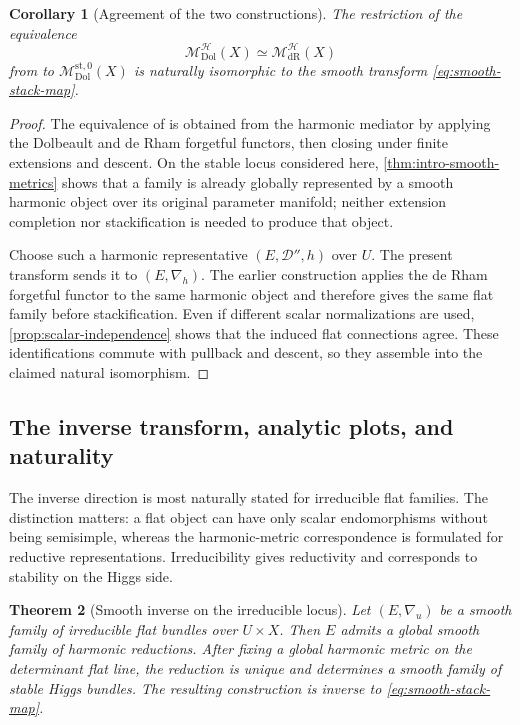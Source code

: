 \documentclass[11pt,reqno]{amsart}
\newtheorem{theorem}{Theorem}[section]
\newtheorem{corollary}[theorem]{Corollary}
\theoremstyle{definition}
\theoremstyle{remark}
\newcommand{\cD}{\mathcal D}
\newcommand{\cH}{\mathcal H}
\newcommand{\Dol}{\mathrm{Dol}}
\newcommand{\dR}{\mathrm{dR}}
\newcommand{\st}{\mathrm{st}}
\newcommand{\MdiffDol}{\mathscr M_{\Dol}}
\newcommand{\MHDol}{\mathscr M^{\cH}_{\Dol}}
\newcommand{\MHdR}{\mathscr M^{\cH}_{\dR}}
\begin{document}
\begin{corollary}[Agreement of the two constructions]\label{cor:agreement}
The restriction of the equivalence
\[
  \MHDol(X)\simeq\MHdR(X)
\]
from \cite{AzamRayan2026} to $\MdiffDol^{\st,0}(X)$ is naturally isomorphic to the smooth transform \eqref{eq:smooth-stack-map}.
\end{corollary}

\begin{proof}
The equivalence of \cite{AzamRayan2026} is obtained from the harmonic mediator by applying the Dolbeault and de Rham forgetful functors, then closing under finite extensions and descent.  On the stable locus considered here, \cref{thm:intro-smooth-metrics} shows that a family is already globally represented by a smooth harmonic object over its original parameter manifold; neither extension completion nor stackification is needed to produce that object.

Choose such a harmonic representative $(E,\cD'',h)$ over $U$.  The present transform sends it to $(E,\nabla_h)$.  The earlier construction applies the de Rham forgetful functor to the same harmonic object and therefore gives the same flat family before stackification.  Even if different scalar normalizations are used, \cref{prop:scalar-independence} shows that the induced flat connections agree.  These identifications commute with pullback and descent, so they assemble into the claimed natural isomorphism.
\end{proof}

\subsection{The inverse transform, analytic plots, and naturality}

The inverse direction is most naturally stated for irreducible flat families.  The distinction matters: a flat object can have only scalar endomorphisms without being semisimple, whereas the harmonic-metric correspondence is formulated for reductive representations.  Irreducibility gives reductivity and corresponds to stability on the Higgs side.

\begin{theorem}[Smooth inverse on the irreducible locus]\label{thm:smooth-inverse}
Let $(E,\nabla_u)$ be a smooth family of irreducible flat bundles over $U\times X$.  Then $E$ admits a global smooth family of harmonic reductions.  After fixing a global harmonic metric on the determinant flat line, the reduction is unique and determines a smooth family of stable Higgs bundles.  The resulting construction is inverse to \eqref{eq:smooth-stack-map}.
\end{theorem}
\end{document}
